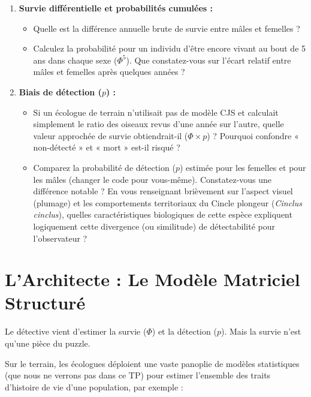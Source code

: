 \documentclass[
  french,
  a4paper,
  DIV=11,
  numbers=noendperiod,
  oneside]{scrreprt}
\providecommand{\tightlist}{%
  \setlength{\itemsep}{0pt}\setlength{\parskip}{0pt}}
\begin{document}
\begin{enumerate}
\def\labelenumi{\arabic{enumi}.}
\tightlist
\item
  \textbf{Survie différentielle et probabilités cumulées :}

  \begin{itemize}
  \tightlist
  \item
    Quelle est la différence annuelle brute de survie entre mâles et
    femelles ?
  \item
    Calculez la probabilité pour un individu d'être encore vivant au
    bout de 5 ans dans chaque sexe (\(\Phi^5\)). Que constatez-vous sur
    l'écart relatif entre mâles et femelles après quelques années ?
  \end{itemize}
\item
  \textbf{Biais de détection (\(p\)) :}

  \begin{itemize}
  \tightlist
  \item
    Si un écologue de terrain n'utilisait pas de modèle CJS et calculait
    simplement le ratio des oiseaux revus d'une année sur l'autre,
    quelle valeur approchée de survie obtiendrait-il (\(\Phi \times p\))
    ? Pourquoi confondre « non-détecté » et « mort » est-il risqué ?
  \item
    Comparez la probabilité de détection (\(p\)) estimée pour les
    femelles et pour les mâles (changer le code pour vous-même).
    Constatez-vous une différence notable ? En vous renseignant
    brièvement sur l'aspect visuel (plumage) et les comportements
    territoriaux du Cincle plongeur (\emph{Cinclus cinclus}), quelles
    caractéristiques biologiques de cette espèce expliquent logiquement
    cette divergence (ou similitude) de détectabilité pour l'observateur
    ?
  \end{itemize}
\end{enumerate}

\section{L'Architecte : Le Modèle Matriciel
Structuré}\label{larchitecte-le-moduxe8le-matriciel-structuruxe9}

Le détective vient d'estimer la survie (\(\Phi\)) et la détection
(\(p\)). Mais la survie n'est qu'une pièce du puzzle.

Sur le terrain, les écologues déploient une vaste panoplie de modèles
statistiques (que nous ne verrons pas dans ce TP) pour estimer
l'ensemble des traits d'histoire de vie d'une population, par exemple :
\end{document}
